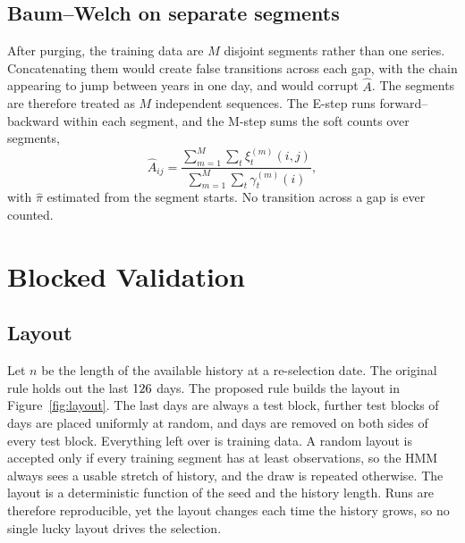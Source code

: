 \documentclass[11pt]{article}
\begin{document}
\subsection{Baum--Welch on separate segments}

After purging, the training data are $M$ disjoint segments rather than one series. Concatenating them would create false transitions across each gap, with the chain appearing to jump between years in one day, and would corrupt $\hat A$. The segments are therefore treated as $M$ independent sequences. The E-step runs forward--backward within each segment, and the M-step sums the soft counts over segments,
\begin{equation}
\hat A_{ij}=\frac{\sum_{m=1}^{M}\sum_{t}\xi^{(m)}_t(i,j)}{\sum_{m=1}^{M}\sum_{t}\gamma^{(m)}_t(i)},
\end{equation}
with $\hat\pi$ estimated from the segment starts. No transition across a gap is ever counted.

\section{Blocked Validation}\label{sec:blocked}

\subsection{Layout}

Let $n$ be the length of the available history at a re-selection date. The original rule holds out the last $126{}$ days. The proposed rule builds the layout in Figure~\ref{fig:layout}. The last \HoldoutDays{} days are always a test block, \RandomBlocks{} further test blocks of \BlockLen{} days are placed uniformly at random, and \GapDays{} days are removed on both sides of every test block. Everything left over is training data. A random layout is accepted only if every training segment has at least \MinSegment{} observations, so the HMM always sees a usable stretch of history, and the draw is repeated otherwise. The layout is a deterministic function of the seed and the history length. Runs are therefore reproducible, yet the layout changes each time the history grows, so no single lucky layout drives the selection.
\end{document}
